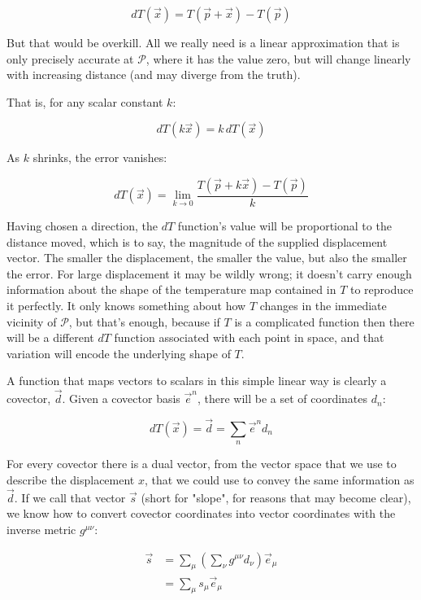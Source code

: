 $$
dT(\vec{x}) = T(\vec{p} + \vec{x}) - T(\vec{p})
$$

But that would be overkill. All we really need is a linear approximation that is only precisely accurate at $\mathcal{P}$, where it has the value zero, but will change linearly with increasing distance (and may diverge from the truth). 

That is, for any scalar constant $k$:

$$
dT(k \vec{x}) = k \, dT(\vec{x})
$$

As $k$ shrinks, the error vanishes:

\begin{equation}
    dT(\vec{x}) = \lim_{k \to 0} \frac{T(\vec{p} + k\vec{x}) - T(\vec{p})}{k}
    \label{eqn:directional-derivative-limit}
\end{equation}

Having chosen a direction, the $dT$ function's value will be proportional to the distance moved, which is to say, the magnitude of the supplied displacement vector. The smaller the displacement, the smaller the value, but also the smaller the error. For large displacement it may be wildly wrong; it doesn't carry enough information about the shape of the temperature map contained in $T$ to reproduce it perfectly. It only knows something about how $T$ changes in the immediate vicinity of $\mathcal{P}$, but that's enough, because if $T$ is a complicated function then there will be a different $dT$ function associated with each point in space, and that variation will encode the underlying shape of $T$.

A function that maps vectors to scalars in this simple linear way is clearly a covector, $\vec{d}$. Given a covector basis $\vec{e}^n$, there will be a set of coordinates $d_n$:

\begin{equation}
    dT(\vec{x}) = \vec{d} = \sum_n \vec{e}^n d_n
    \label{eqn:covector-directional-derivative}
\end{equation}

For every covector there is a dual vector, from the vector space that we use to describe the displacement $x$, that we could use to convey the same information as $\vec{d}$. If we call that vector $\vec{s}$ (short for "slope", for reasons that may become clear), we know how to convert covector coordinates into vector coordinates with the inverse metric $g^{\mu\nu}$:

\begin{equation}
\begin{split}
\vec{s} 
&= \sum_{\mu} \left( \sum_{\nu} g^{\mu\nu} d_{\nu} \right) \vec{e}_{\mu} \\
&= \sum_{\mu} s_{\mu} \vec{e}_{\mu}
\label{eqn:vector-gradient}
\end{split}
\end{equation}

